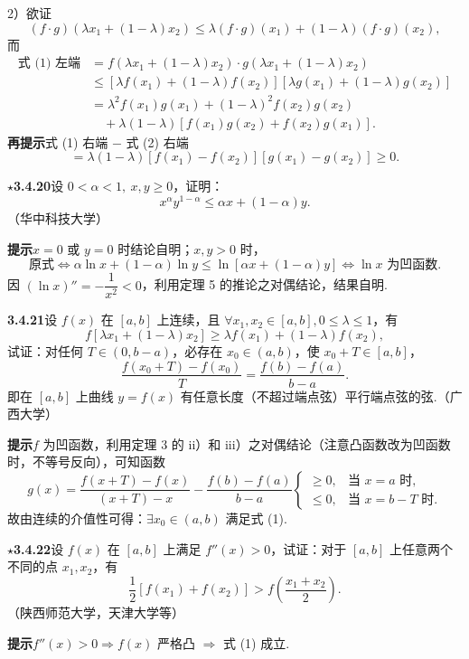 \documentclass[UTF8, 12pt, fontset=fandol, oneside]{ctexart}
\begin{document}
2）欲证
\[
  (f\cdot g)(\lambda x_1+(1-\lambda)x_2)
  \le \lambda(f\cdot g)(x_1)+(1-\lambda)(f\cdot g)(x_2), \tag{1}
\]
而
\[
\begin{aligned}
\text{式 (1) 左端}
&=f(\lambda x_1+(1-\lambda)x_2)\cdot g(\lambda x_1+(1-\lambda)x_2)\\
&\le[\lambda f(x_1)+(1-\lambda)f(x_2)]
  [\lambda g(x_1)+(1-\lambda)g(x_2)]\\
&=\lambda^2f(x_1)g(x_1)+(1-\lambda)^2f(x_2)g(x_2)\\
&\quad+\lambda(1-\lambda)[f(x_1)g(x_2)+f(x_2)g(x_1)].
\end{aligned}\tag{2}
\]
\noindent\textbf{再提示}\quad 式 (1) 右端 $-$ 式 (2) 右端
\[
  =\lambda(1-\lambda)[f(x_1)-f(x_2)][g(x_1)-g(x_2)]\ge0.
\]

\noindent\textbf{$\star$3.4.20}\quad 设 $0<\alpha<1,\ x,y\ge0$，证明：
\[
  x^\alpha y^{1-\alpha}\le \alpha x+(1-\alpha)y.
\]
（华中科技大学）

\noindent\textbf{提示}\quad $x=0$ 或 $y=0$ 时结论自明；$x,y>0$ 时，
\[
  \text{原式}\Leftrightarrow \alpha\ln x+(1-\alpha)\ln y\le\ln[\alpha x+(1-\alpha)y]\Leftrightarrow \ln x\text{ 为凹函数}.
\]
因 $(\ln x)''=-\dfrac1{x^2}<0$，利用定理 5 的推论之对偶结论，结果自明.

\noindent\textbf{3.4.21}\quad 设 $f(x)$ 在 $[a,b]$ 上连续，且 $\forall x_1,x_2\in[a,b],0\le\lambda\le1$，有
\[
  f[\lambda x_1+(1-\lambda)x_2]\ge\lambda f(x_1)+(1-\lambda)f(x_2),
\]
试证：对任何 $T\in(0,b-a)$，必存在 $x_0\in(a,b)$，使 $x_0+T\in[a,b]$，
\[
  \frac{f(x_0+T)-f(x_0)}T=\frac{f(b)-f(a)}{b-a}. \tag{1}
\]
即在 $[a,b]$ 上曲线 $y=f(x)$ 有任意长度（不超过端点弦）平行端点弦的弦.（广西大学）

\noindent\textbf{提示}\quad $f$ 为凹函数，利用定理 3 的 ii）和 iii）之对偶结论（注意凸函数改为凹函数时，不等号反向），可知函数
\[
  g(x)=\frac{f(x+T)-f(x)}{(x+T)-x}-\frac{f(b)-f(a)}{b-a}
  \begin{cases}
  \ge0, & \text{当 }x=a\text{ 时},\\
  \le0, & \text{当 }x=b-T\text{ 时}.
  \end{cases}
\]
故由连续的介值性可得：$\exists x_0\in(a,b)$ 满足式 (1).

\noindent\textbf{$\star$3.4.22}\quad 设 $f(x)$ 在 $[a,b]$ 上满足 $f''(x)>0$，试证：对于 $[a,b]$ 上任意两个不同的点 $x_1,x_2$，有
\[
  \frac12[f(x_1)+f(x_2)]>f\left(\frac{x_1+x_2}2\right). \tag{1}
\]
（陕西师范大学，天津大学等）

\noindent\textbf{提示}\quad $f''(x)>0\Rightarrow f(x)$ 严格凸 $\Rightarrow$ 式 (1) 成立.
\end{document}
